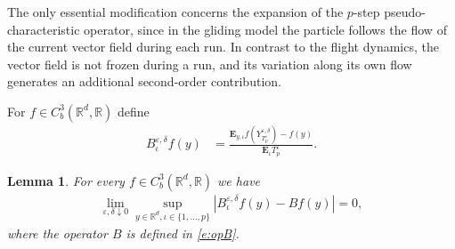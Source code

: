 \documentclass[10pt]{article}
\newcommand{\E}{\mathbf{E}}
\newcommand{\1}{1\!\!\!\;{\rm I}}
\theoremstyle{plain}
\newtheorem{lem}[thm]{Lemma}
\theoremstyle{definition}
\newcommand{\e}{\varepsilon}
\newcommand{\ba}{\begin{equation}\begin{aligned}}
\newcommand{\ea}{\end{aligned}\end{equation}}
\newcommand{\bR}{\mathbb{R}}
\numberwithin{equation}{section}
\begin{document}
The only essential modification concerns the expansion of the $p$-step pseudo-characteristic operator,
since in the gliding model the particle follows the flow of the current vector field during each run.
In contrast to the flight dynamics, the vector field is not frozen during a run, and its variation
along its own flow generates an additional second-order contribution.


For $f\in C^3_b(\bR^d,\bR)$ define
\ba
B_\iota^{\e,\delta }f(y)&=\frac{\E_{y,\iota} f(Y^{\e,\delta}_{T^\e_{p}}) - f(y)}{\E_\iota T_p^\e }.
\ea

\begin{lem}
\label{l:B}
For every $f\in C^3_b(\bR^d,\bR)$ we have
\ba
\label{e:Biota}
\lim_{\e,\delta \downarrow 0} \sup_{y\in\mathbb R^d,\iota\in\{1,\dots,p\}}
|B_\iota^{\e,\delta }f(y) -B f(y)|=0,
\ea
where the operator $B$ is defined in \eqref{e:opB}.
\end{lem}
\end{document}
